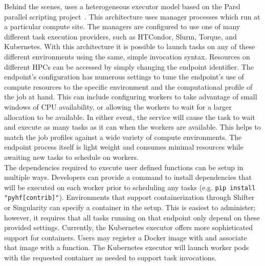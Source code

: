 Behind the scenes, \funcX{} uses a heterogeneous executor model based on the Parsl parallel scripting project~\cite{Parsl_paper}.
This architecture uses manager processes which run at a particular compute site.
The managers are configured to use one of many different task execution providers, such as HTCondor, Slurm, Torque, and Kubernetes.
With this architecture it is possible to launch tasks on any of these different environments using the same, simple invocation syntax.
Resources on different HPCs can be accessed by simply changing the endpoint identifier.
The endpoint's configuration has numerous settings to tune the endpoint's use of compute resources to the specific environment and the computational profile of the job at hand.
This can include configuring workers to take advantage of small windows of CPU availability, or allowing the workers to wait for a larger allocation to be available.
In either event, the \funcX{} service will cause the task to wait and execute as many tasks as it can when the workers are available.
This helps to match the job profiles against a wide variety of compute environments.
The endpoint process itself is light weight and consumes minimal resources while awaiting new tasks to schedule on workers.\\

The dependencies required to execute user defined functions can be setup in multiple ways.
Developers can provide a command to install dependencies that will be executed on each worker prior to scheduling any tasks (e.g. \texttt{pip install "pyhf[contrib]"}).
Environments that support containerization through Shifter or Singularity can specify a container in the setup.
This is easiest to administer; however, it requires that all tasks running on that endpoint only depend on these provided settings.
Currently, the Kubernetes executor offers more sophisticated support for containers.
Users may register a Docker image with \funcX{} and associate that image with a function.
The Kubernetes executor will launch worker pods with the requested container as needed to support task invocations.
